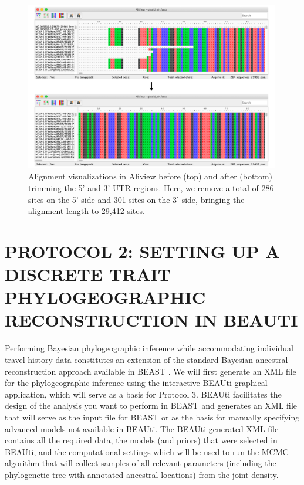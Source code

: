 \documentclass{article}
\begin{document}
\begin{figure}[!ht]
    \centering
    \includegraphics[width=0.99\textwidth]{figs/aliview.pdf}
    \caption{Alignment visualizations in Aliview before (top) and after (bottom) trimming the 5' and 3' UTR regions. Here, we remove a total of 286 sites on the 5' side and 301 sites on the 3' side, bringing the alignment length to 29,412 sites.}
    \label{fig:aliview}
\end{figure}


\section*{PROTOCOL 2: SETTING UP A DISCRETE TRAIT PHYLOGEOGRAPHIC RECONSTRUCTION IN BEAUTI}

Performing Bayesian phylogeographic inference while accommodating individual travel history data constitutes an extension of the standard Bayesian ancestral reconstruction approach available in BEAST \cite{dta}.
We will first generate an XML file for the phylogeographic inference using the interactive BEAUti graphical application, which will serve as a basis for Protocol 3. BEAUti facilitates the design of the analysis you want to perform in BEAST and generates an XML file that will serve as the input file for BEAST or as the basis for manually specifying advanced models not available in BEAUti.
The BEAUti-generated XML file contains all the required data, the models (and priors) that were selected in BEAUti, and the computational settings which will be used to run the MCMC algorithm that will collect samples of all relevant parameters (including the phylogenetic tree with annotated ancestral locations) from the joint density. \\ 
\end{document}

